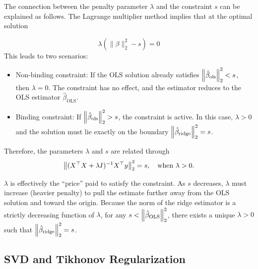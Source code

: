 \documentclass[
  letterpaper,
  DIV=11,
  numbers=noendperiod]{scrreprt}
\providecommand{\tightlist}{%
  \setlength{\itemsep}{0pt}\setlength{\parskip}{0pt}}
\newcommand{\ols}{\mathrm{OLS}}
\theoremstyle{definition}
\theoremstyle{definition}
\theoremstyle{plain}
\theoremstyle{plain}
\theoremstyle{remark}
\begin{document}
\begin{tcolorbox}[enhanced jigsaw, arc=.35mm, bottomrule=.15mm, bottomtitle=1mm, breakable, colback=white, colbacktitle=quarto-callout-note-color!10!white, colframe=quarto-callout-note-color-frame, coltitle=black, left=2mm, leftrule=.75mm, opacityback=0, opacitybacktitle=0.6, rightrule=.15mm, title=\textcolor{quarto-callout-note-color}{\faInfo}\hspace{0.5em}{Relation Between \(\lambda\) and \(s\)}, titlerule=0mm, toprule=.15mm, toptitle=1mm]

The connection between the penalty parameter \(\lambda\) and the
constraint \(s\) can be explained as follows. The Lagrange multiplier
method implies that at the optimal solution

\[
\lambda (\|\beta\|_2^2 - s) = 0
\] This leads to two scenarios:

\begin{itemize}
\tightlist
\item
  Non-binding constraint: If the OLS solution already satisfies
  \(\norm{\hat{\beta}_{\text{ols}}}_2^2 < s\), then \(\lambda = 0\). The
  constraint has no effect, and the estimator reduces to the OLS
  estimator \(\hat{\beta}_{\ols}\).
\item
  Binding constraint: If \(\norm{\hat{\beta}_{\text{ols}}}_2^2 > s\),
  the constraint is active. In this case, \(\lambda > 0\) and the
  solution must lie exactly on the boundary
  \(\norm{\hat{\beta}_{\text{ridge}}}_2^2 = s\).
\end{itemize}

Therefore, the parameters \(\lambda\) and \(s\) are related through \[
\norm{(X^\top X + \lambda I)^{-1}X^\top y}_2^2 = s,
\quad
\text{when } \lambda > 0 .
\]

\(\lambda\) is effectively the ``price'' paid to satisfy the constraint.
As \(s\) decreases, \(\lambda\) must increase (heavier penalty) to pull
the estimate further away from the OLS solution and toward the origin.
Because the norm of the ridge estimator is a strictly decreasing
function of \(\lambda\), for any \(s < \norm{\hat{\beta}_{\ols}}_2^2\),
there exists a unique \(\lambda > 0\) such that
\(\norm{\hat{\beta}_{\text{ridge}}}_2^2 = s\).

\end{tcolorbox}

\subsection{SVD and Tikhonov
Regularization}\label{svd-and-tikhonov-regularization}
\end{document}

